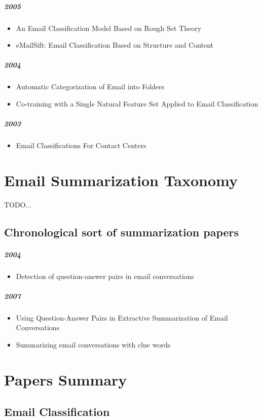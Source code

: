\documentclass[12pt]{article}
\begin{document}
\subparagraph{2005}
\begin{itemize}
\item An Email Classification Model Based on Rough Set Theory
\item eMailSift: Email Classification Based on Structure and Content
\end{itemize}

\subparagraph{2004}
\begin{itemize}
\item Automatic Categorization of Email into Folders
\item Co-training with a Single Natural Feature Set Applied to Email Classification
\end{itemize}

\subparagraph{2003}
\begin{itemize}
\item Email Classifications For Contact Centers
\end{itemize}

\newpage
\section{Email Summarization Taxonomy}
TODO...
\subsection{Chronological sort of summarization papers}
\subparagraph{2004}
\begin{itemize}
\item Detection of question-answer pairs in email conversations
\end{itemize}

\subparagraph{2007}
\begin{itemize}
\item Using Question-Answer Pairs in Extractive Summarization of Email Conversations
\item Summarizing email conversations with clue words
\end{itemize}



\section{Papers Summary}
\subsection{Email Classification}
\end{document}
